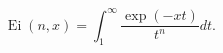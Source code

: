 \begin{equation}
\operatorname{Ei}(n,x)=\int_{1}^{\infty}\frac{\exp(-xt)}{t^{n}}dt.
\end{equation}

